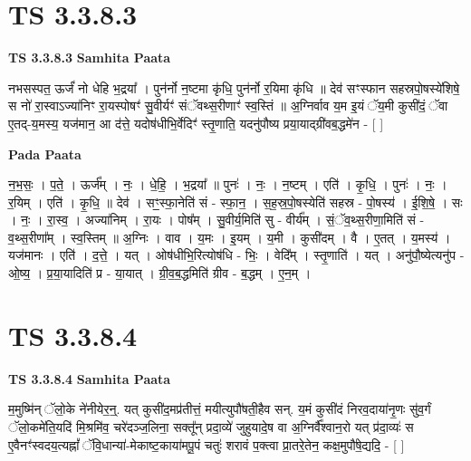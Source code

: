 \documentclass[17pt]{extarticle}
\begin{document}

\section{ TS 3.3.8.3 }

\textbf{TS 3.3.8.3 } \newline
\textbf{Samhita Paata} \newline

नभसस्पत॒ ऊर्जं॑ नो धेहि भ॒द्रया᳚ । पुन॑र्नो न॒ष्टमा कृ॑धि॒ पुन॑र्नो र॒यिमा कृ॑धि ॥ देव॑ सꣳस्फान सहस्रपो॒षस्ये॑शिषे॒ स नो॑ रा॒स्वाऽज्या॑निꣳ रा॒यस्पोषꣳ॑ सु॒वीर्यꣳ॑ संॅवथ्स॒रीणाꣳ॑ स्व॒स्तिं ॥ अ॒ग्निर्वाव य॒म इ॒यं ॅय॒मी कुसी॑दं॒ ॅवा ए॒तद्-य॒मस्य॒ यज॑मान॒ आ द॑त्ते॒ यदोष॑धीभि॒र्वेदिꣳ॑ स्तृ॒णाति॒ यदनु॑पौष्य प्रया॒याद्ग्री॑वब॒द्धमे॑न - [  ] \newline

\textbf{Pada Paata} \newline

न॒भ॒सः॒ । प॒ते॒ । ऊर्ज᳚म् । नः॒ । धे॒हि॒ । भ॒द्रया᳚ ॥ पुनः॑ । नः॒ । न॒ष्टम् । एति॑ । कृ॒धि॒ । पुनः॑ । नः॒ । र॒यिम् । एति॑ । कृ॒धि॒ ॥ देव॑ । सꣳ॒॒स्फा॒नेति॑ सं - स्फा॒न॒ । स॒ह॒स्र॒पो॒षस्येति॑ सहस्र - पो॒षस्य॑ । ई॒शि॒षे॒ । सः । नः॒ । रा॒स्व॒ । अज्या॑निम् । रा॒यः । पोष᳚म् । सु॒वीर्य॒मिति॑ सु - वीर्य᳚म् । सं॒ॅव॒थ्स॒रीणा॒मिति॑ सं - व॒थ्स॒रीणा᳚म् । स्व॒स्तिम् ॥ अ॒ग्निः । वाव । य॒मः । इ॒यम् । य॒मी । कुसी॑दम् । वै । ए॒तत् । य॒मस्य॑ । यज॑मानः । एति॑ । द॒त्ते॒ । यत् । ओष॑धीभि॒रित्योष॑धि - भिः॒ । वेदि᳚म् । स्तृ॒णाति॑ । यत् । अनु॑पौ॒ष्येत्यनु॑प - ओ॒ष्य॒ । प्र॒या॒यादिति॑ प्र - या॒यात् । ग्री॒व॒ब॒द्धमिति॑ ग्रीव - ब॒द्धम् । ए॒न॒म् ।  \newline





\section{ TS 3.3.8.4 }

\textbf{TS 3.3.8.4 } \newline
\textbf{Samhita Paata} \newline

म॒मुष्मि॑न् ॅलो॒के ने॑नीयेर॒न्॒. यत् कुसी॑द॒मप्र॑तीत्तं॒ मयीत्युपौ॑षती॒हैव सन्. य॒मं कुसी॑दं निरव॒दाया॑नृ॒णः सु॑व॒र्गं ॅलो॒कमे॑ति॒यदि॑ मि॒श्रमि॑व॒ चरे॑दञ्ज॒लिना॒ सक्तू᳚न् प्रदा॒व्ये॑ जुहुयादे॒ष वा अ॒ग्निर्वै᳚श्वान॒रो यत् प्र॑दा॒व्यः॑ स ए॒वैनꣳ॑स्वदय॒त्यह्नां᳚ ॅवि॒धान्या॑-मेकाष्ट॒काया॑मपू॒पं चतुः॑ शरावं प॒क्त्वा प्रा॒तरे॒तेन॒ कक्ष॒मुपौ॑षे॒द्यदि॒ - [  ] \newline
\end{document}
